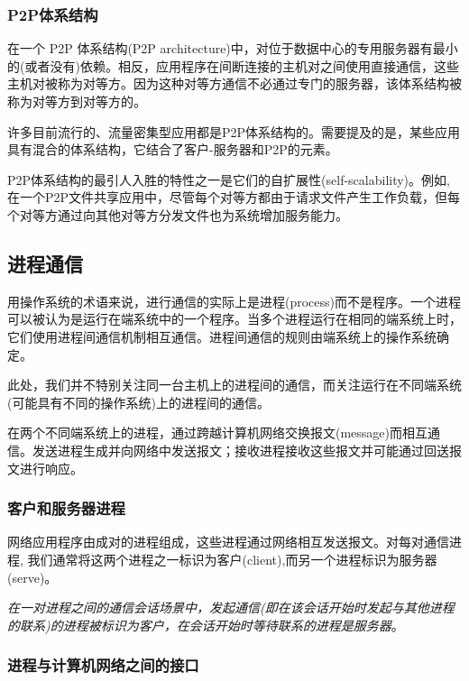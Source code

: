 \subsubsection{P2P体系结构}

    在一个 P2P 体系结构(P2P architecture)中，对位于数据中心的专用服务器有最小的(或者没有)依赖。相反，应用程序在间断连接的主机对之间使用直接通信，这些主机对被称为对等方。因为这种对等方通信不必通过专门的服务器，该体系结构被称为对等方到对等方的。

    许多目前流行的、流量密集型应用都是P2P体系结构的。需要提及的是，某些应用具有混合的体系结构，它结合了客户-服务器和P2P的元素。

    P2P体系结构的最引人入胜的特性之一是它们的自扩展性(self-scalability)。例如, 在一个P2P文件共享应用中，尽管每个对等方都由于请求文件产生工作负载，但每个对等方通过向其他对等方分发文件也为系统增加服务能力。

\subsection{进程通信}

    用操作系统的术语来说，进行通信的实际上是进程(process)而不是程序。一个进程可以被认为是运行在端系统中的一个程序。当多个进程运行在相同的端系统上时，它们使用进程间通信机制相互通信。进程间通信的规则由端系统上的操作系统确定。

    此处，我们并不特别关注同一台主机上的进程间的通信，而关注运行在不同端系统(可能具有不同的操作系统)上的进程间的通信。

    在两个不同端系统上的进程，通过跨越计算机网络交换报文(message)而相互通信。发送进程生成并向网络中发送报文；接收进程接收这些报文并可能通过回送报文进行响应。

\subsubsection{客户和服务器进程}

    网络应用程序由成对的进程组成，这些进程通过网络相互发送报文。对每对通信进程, 我们通常将这两个进程之一标识为客户(client),而另一个进程标识为服务器(serve)。

    \emph{在一对进程之间的通信会话场景中，发起通信(即在该会话开始时发起与其他进程的联系)的进程被标识为客户，在会话开始时等待联系的进程是服务器}。

\subsubsection{进程与计算机网络之间的接口}

